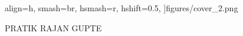 \begin{titlepage}
\begin{addmargin}[-1cm]{-3cm}
          align=h,
          smash=br,
          hsmash=r,
          hshift=0.5\textwidth,
          ]{figures/cover_2.png}
        {
          \begin{flushleft}
            \par
          \end{flushleft}
        }
        
        \vspace{81mm}

        \sffamily\huge{PRATIK RAJAN GUPTE}

        \vfill




        \vfill

  \end{addmargin}
\end{titlepage}

\nopagecolor
